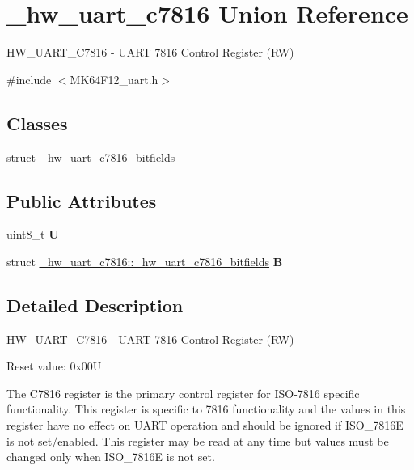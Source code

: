 \hypertarget{union__hw__uart__c7816}{}\section{\+\_\+hw\+\_\+uart\+\_\+c7816 Union Reference}
\label{union__hw__uart__c7816}


H\+W\+\_\+\+U\+A\+R\+T\+\_\+\+C7816 -\/ U\+A\+RT 7816 Control Register (RW)  




{\ttfamily \#include $<$M\+K64\+F12\+\_\+uart.\+h$>$}

\subsection*{Classes}
\begin{DoxyCompactItemize}
\item 
struct \hyperlink{struct__hw__uart__c7816_1_1__hw__uart__c7816__bitfields}{\+\_\+hw\+\_\+uart\+\_\+c7816\+\_\+bitfields}
\end{DoxyCompactItemize}
\subsection*{Public Attributes}
\begin{DoxyCompactItemize}
\item 
uint8\+\_\+t {\bfseries U}\hypertarget{union__hw__uart__c7816_a872bb1e10074ddaece67df77925326c2}{}\label{union__hw__uart__c7816_a872bb1e10074ddaece67df77925326c2}

\item 
struct \hyperlink{struct__hw__uart__c7816_1_1__hw__uart__c7816__bitfields}{\+\_\+hw\+\_\+uart\+\_\+c7816\+::\+\_\+hw\+\_\+uart\+\_\+c7816\+\_\+bitfields} {\bfseries B}\hypertarget{union__hw__uart__c7816_ac6bd477ae3599d1f99d990739d4a7020}{}\label{union__hw__uart__c7816_ac6bd477ae3599d1f99d990739d4a7020}

\end{DoxyCompactItemize}


\subsection{Detailed Description}
H\+W\+\_\+\+U\+A\+R\+T\+\_\+\+C7816 -\/ U\+A\+RT 7816 Control Register (RW) 

Reset value\+: 0x00U

The C7816 register is the primary control register for I\+S\+O-\/7816 specific functionality. This register is specific to 7816 functionality and the values in this register have no effect on U\+A\+RT operation and should be ignored if I\+S\+O\+\_\+7816E is not set/enabled. This register may be read at any time but values must be changed only when I\+S\+O\+\_\+7816E is not set. 

